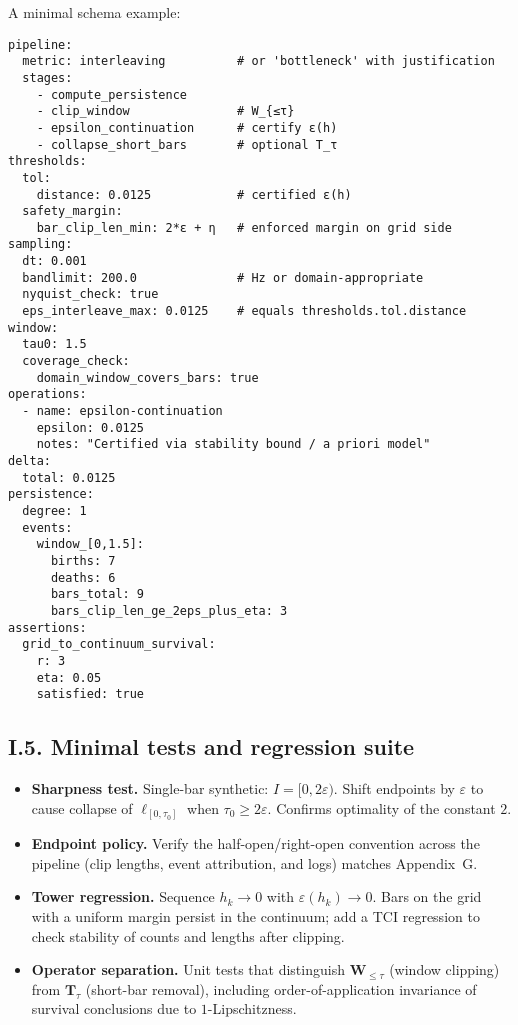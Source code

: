\documentclass[11pt]{article}
\numberwithin{equation}{section}
\theoremstyle{plain}
\theoremstyle{definition}
\theoremstyle{remark}
\theoremstyle{plain}
\theoremstyle{definition}
\numberwithin{equation}{section}
\theoremstyle{definition}
\numberwithin{equation}{section}
\theoremstyle{plain}
\theoremstyle{definition}
\theoremstyle{remark}
\begin{document}
A minimal schema example:
\begin{verbatim}
pipeline:
  metric: interleaving          # or 'bottleneck' with justification
  stages:
    - compute_persistence
    - clip_window               # W_{≤τ}
    - epsilon_continuation      # certify ε(h)
    - collapse_short_bars       # optional T_τ
thresholds:
  tol:
    distance: 0.0125            # certified ε(h)
  safety_margin:
    bar_clip_len_min: 2*ε + η   # enforced margin on grid side
sampling:
  dt: 0.001
  bandlimit: 200.0              # Hz or domain-appropriate
  nyquist_check: true
  eps_interleave_max: 0.0125    # equals thresholds.tol.distance
window:
  tau0: 1.5
  coverage_check:
    domain_window_covers_bars: true
operations:
  - name: epsilon-continuation
    epsilon: 0.0125
    notes: "Certified via stability bound / a priori model"
delta:
  total: 0.0125
persistence:
  degree: 1
  events:
    window_[0,1.5]:
      births: 7
      deaths: 6
      bars_total: 9
      bars_clip_len_ge_2eps_plus_eta: 3
assertions:
  grid_to_continuum_survival:
    r: 3
    eta: 0.05
    satisfied: true
\end{verbatim}

\subsection*{I.5. Minimal tests and regression suite}
\begin{itemize}\itemsep0.25em
\item \textbf{Sharpness test.} Single-bar synthetic: \(I=[0,2\varepsilon)\). Shift endpoints by \(\varepsilon\) to cause collapse of \(\ell_{[0,\tau_0]}\) when \(\tau_0\ge 2\varepsilon\). Confirms optimality of the constant \(2\).
\item \textbf{Endpoint policy.} Verify the half-open/right-open convention across the pipeline (clip lengths, event attribution, and logs) matches Appendix~G.
\item \textbf{Tower regression.} Sequence \(h_k\to 0\) with \(\varepsilon(h_k)\to 0\). Bars on the grid with a uniform margin persist in the continuum; add a TCI regression to check stability of counts and lengths after clipping.
\item \textbf{Operator separation.} Unit tests that distinguish \(\mathbf{W}_{\le\tau}\) (window clipping) from \(\mathbf{T}_\tau\) (short-bar removal), including order-of-application invariance of survival conclusions due to \(1\)-Lipschitzness.
\end{itemize}
\end{document}
